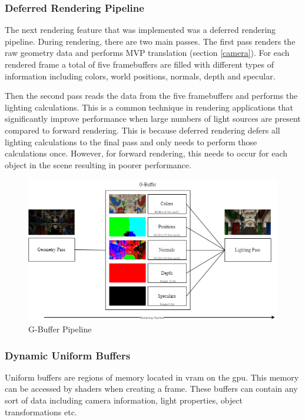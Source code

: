 \documentclass[11pt]{article}
\begin{document}
\subsubsection{Deferred Rendering Pipeline}
The next rendering feature that was implemented was a deferred rendering
pipeline. During rendering, there are two main passes. The first pass renders
the raw geometry data and performs MVP translation (section \ref{camera}). For
each rendered frame a total of five framebuffers are filled with different types of
information including colors, world positions, normals, depth and specular.

Then the second pass reads the data from the five framebuffers and performs the
lighting calculations. This is a common technique in rendering applications that
significantly improve performance when large numbers of light sources are
present compared to forward rendering. This is because deferred rendering defers
all lighting calculations to the final pass and only needs to perform those
calculations once. However, for forward rendering, this needs to occur for each
object in the scene resulting in poorer performance.

\begin{figure}[H]
  \centering
  \includegraphics[width=\textwidth]{images/g_buffer.png}
  \caption{G-Buffer Pipeline}
  \label{fig:g_buffer}
\end{figure}



\subsubsection{Dynamic Uniform Buffers}
Uniform buffers are regions of memory located in \gls*{vram} on the \gls*{gpu}.
This memory can be accessed by shaders when creating a frame. These buffers can
contain any sort of data including camera information, light properties, object
transformations etc.
\end{document}

